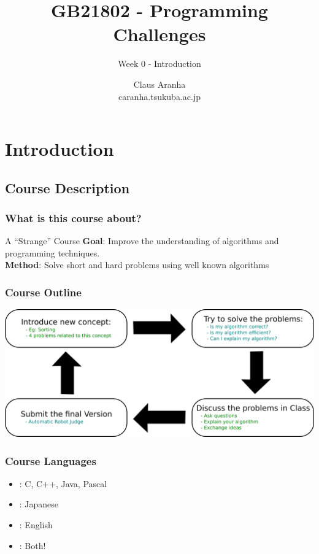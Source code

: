 \documentclass{beamer}
\title[GB21802]{GB21802 - Programming Challenges}
\subtitle[]{Week 0 - Introduction}
\author[Claus Aranha]{Claus Aranha\\{\footnotesize caranha\@@cs.tsukuba.ac.jp}}
\institute{Department of Computer Science}
\begin{document}
\begin{frame}
\maketitle
\end{frame}


\section{Introduction}
\subsection{Course Description}

\begin{frame}
  \frametitle{What is this course about?}
  \begin{block}{A ``Strange'' Course}
    {\bf Goal}: Improve the understanding of algorithms and programming techniques.\\
    {\bf Method}: Solve short and hard problems using well known algorithms 
  \end{block}
\end{frame}

\begin{frame}
  \frametitle{Course Outline}
  \begin{center}
    \includegraphics[width=1\textwidth]{classoutline}
  \end{center}
\end{frame}

\begin{frame}
  \frametitle{Course Languages}
  
  \begin{center}
    \begin{itemize}
    \item{}: C, C++, Java, {\tiny Pascal}
    \item{}: Japanese
    \item{}: English
    \item{}: Both!
    \end{itemize}
  \end{center}
\end{frame}
\end{document}
